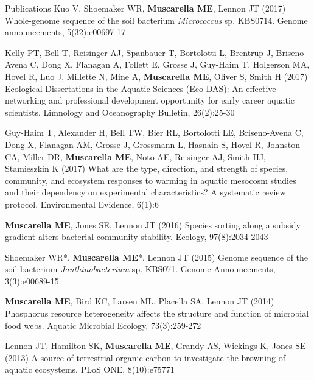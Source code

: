 \documentclass{resume} %
\begin{document}
\begin{rSection}{Publications}
Kuo V, Shoemaker WR, {\bf Muscarella ME}, Lennon JT (2017) Whole-genome sequence
of the soil bacterium {\em Micrococcus} sp. KBS0714.
Genome announcements, 5(32):e00697-17

Kelly PT, Bell T, Reisinger AJ, Spanbauer T, Bortolotti L, Brentrup J,
Briseno-Avena C, Dong X,  Flanagan A, Follett E, Grosse J, Guy-Haim T,
Holgerson MA, Hovel R, Luo J, Millette N, Mine A, {\bf Muscarella ME},
Oliver S, Smith H (2017) Ecological Dissertations in the Aquatic Sciences
(Eco-DAS): An effective networking and professional development opportunity
for early career aquatic scientists.
Limnology and Oceanography Bulletin, 26(2):25-30

Guy-Haim T, Alexander H, Bell TW, Bier RL, Bortolotti LE, Briseno-Avena C,
Dong X, Flanagan AM, Grosse J, Grossmann L, Hasnain S, Hovel R, Johnston CA,
Miller DR, {\bf Muscarella ME}, Noto AE, Reisinger AJ, Smith HJ, Stamieszkin K
(2017) What are the type, direction, and strength of species, community, and
ecosystem responses to warming in aquatic mesocosm studies and their dependency
on experimental characteristics? A systematic review protocol.
Environmental Evidence, 6(1):6

{\bf Muscarella ME}, Jones SE, Lennon JT (2016) Species sorting along a
subsidy gradient alters bacterial community stability. Ecology, 97(8):2034-2043

Shoemaker WR*, {\bf Muscarella ME}*, Lennon JT (2015) Genome sequence of the
soil bacterium {\em Janthinobacterium} sp. KBS071. Genome Announcements,
3(3):e00689-15

{\bf Muscarella ME}, Bird KC, Larsen ML, Placella SA, Lennon JT (2014)
Phosphorus resource heterogeneity affects the structure and function of
microbial food webs. Aquatic Microbial Ecology, 73(3):259-272

Lennon JT, Hamilton SK, {\bf Muscarella ME}, Grandy AS, Wickings K, Jones SE
(2013) A source of terrestrial organic carbon to investigate the browning of
aquatic ecosystems. PLoS ONE, 8(10):e75771


\end{rSection}
\end{document}
